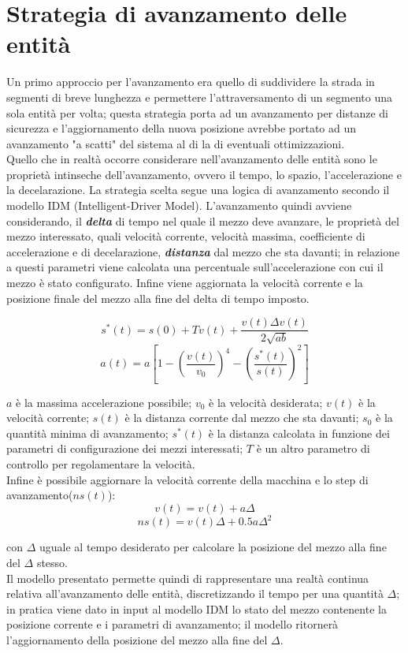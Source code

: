\section{Strategia di avanzamento delle entità}
Un primo approccio per l'avanzamento era quello di suddividere la strada in segmenti di breve lunghezza e permettere l'attraversamento di un segmento una sola entità per volta; questa strategia porta ad un avanzamento per distanze di sicurezza e l'aggiornamento della nuova posizione avrebbe portato ad un avanzamento "a scatti" del sistema al di la di eventuali ottimizzazioni. \\
Quello che in realtà occorre considerare nell'avanzamento delle entità sono le proprietà intinseche dell'avanzamento, ovvero il tempo, lo spazio, l'accelerazione  e la decelarazione. La strategia scelta segue una logica di avanzamento secondo il modello IDM (Intelligent-Driver Model).
L'avanzamento quindi avviene considerando, il \textbf{\textit{delta}} di tempo nel quale il mezzo deve avanzare, le proprietà del mezzo interessato, quali velocità corrente, velocità massima, coefficiente di accelerazione e di decelarazione, \textbf{\textit{distanza}} dal mezzo che sta davanti; in relazione a questi parametri viene calcolata una percentuale sull'accelerazione con cui il mezzo è stato configurato. Infine viene aggiornata la velocità corrente e la posizione finale del mezzo alla fine del delta di tempo imposto.

\begin{equation}
s^{*}(t)=s(0)+Tv(t)+\frac{v(t)\Delta{v(t)}}{2\sqrt{ab}}
\end{equation}
\begin{equation}
a(t)=a[1-(\frac{v(t)}{v_{0}})^4-(\frac{s^{*}(t)}{s(t)})^2]
\end{equation}

$a$ è la massima accelerazione possibile; $v_{0}$ è la velocità desiderata; $v(t)$ è la velocità corrente; $s(t)$ è la distanza corrente dal mezzo che sta davanti; $s_{0}$ è la quantità minima di avanzamento; $s^*(t)$ è la distanza calcolata in funzione dei parametri di configurazione dei mezzi interessati; $T$ è un altro parametro di controllo per regolamentare la velocità.\\
Infine è possibile aggiornare la velocità corrente della macchina e lo step di avanzamento($ns(t)$): \\

\begin{equation}
v(t)= v(t)+a\Delta
\end{equation}
\begin{equation}
ns(t)= v(t)\Delta+0.5a\Delta^2
\end{equation}

con $\Delta$ uguale al tempo desiderato per calcolare la posizione del mezzo alla fine del $\Delta$ stesso. \\
Il modello presentato permette quindi di rappresentare una realtà continua relativa all'avanzamento delle entità, discretizzando il tempo per una quantità $\Delta$; in pratica viene dato in input al modello IDM lo stato del mezzo contenente la posizione corrente e i parametri di avanzamento; il modello ritornerà l'aggiornamento della posizione del mezzo alla fine del $\Delta$.